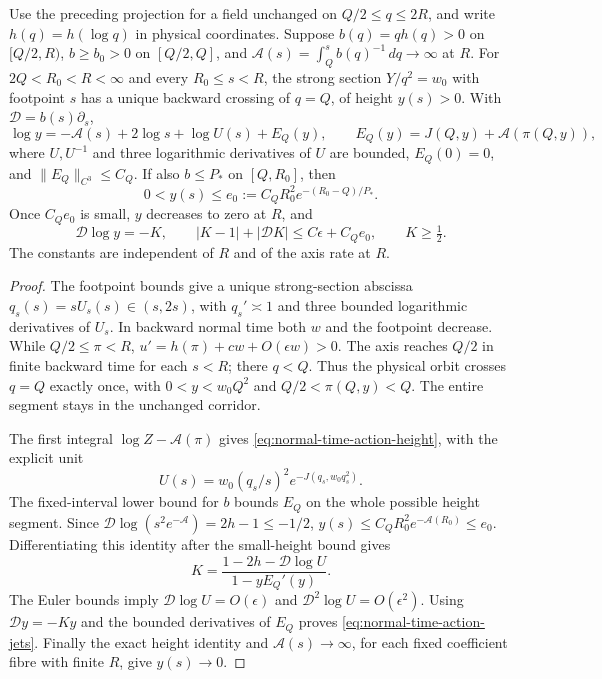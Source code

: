 \begin{lemma}
\label{lem:normal-time-action-height}
Use the preceding projection for a field unchanged on
\(Q/2\le q\le2R\), and write \(h(q)=h(\log q)\) in physical
coordinates. Suppose \(b(q)=qh(q)>0\) on \([Q/2,R)\),
\(b\ge b_0>0\) on \([Q/2,Q]\), and
\(\mathcal A(s)=\int_Q^s b(q)^{-1}\,dq\to\infty\) at \(R\).
For \(2Q<R_0<R<\infty\) and every \(R_0\le s<R\), the strong section
\(Y/q^2=w_0\) with footpoint \(s\) has a unique backward crossing of
\(q=Q\), of height \(y(s)>0\). With \(\mathcal D=b(s)\partial_s\),
\begin{equation}\label{eq:normal-time-action-height}
 \log y=-\mathcal A(s)+2\log s+\log U(s)+E_Q(y),\qquad
 E_Q(y)=J(Q,y)+\mathcal A(\pi(Q,y)),
\end{equation}
where \(U,U^{-1}\) and three logarithmic derivatives of \(U\) are
bounded, \(E_Q(0)=0\), and \(\|E_Q\|_{C^3}\le C_Q\).
If also \(b\le P_*\) on \([Q,R_0]\), then
\[
 0<y(s)\le e_0:=C_QR_0^2e^{-(R_0-Q)/P_*}.
\]
Once \(C_Qe_0\) is small, \(y\) decreases to zero at \(R\), and
\begin{equation}\label{eq:normal-time-action-jets}
 \mathcal D\log y=-K,\qquad
 |K-1|+|\mathcal DK|\le C\epsilon+C_Qe_0,\qquad K\ge\tfrac12.
\end{equation}
The constants are independent of \(R\) and of the axis rate at \(R\).
\end{lemma}
\begin{proof}
The footpoint bounds give a unique strong-section abscissa
\(q_s(s)=sU_s(s)\in(s,2s)\), with \(q_s'\asymp1\) and
three bounded logarithmic derivatives of \(U_s\). In backward
normal time both \(w\) and the footpoint decrease. While
\(Q/2\le\pi<R\),
\(u'=h(\pi)+cw+O(\epsilon w)>0\).
The axis reaches \(Q/2\) in finite backward time for each \(s<R\);
there \(q<Q\). Thus the physical orbit crosses \(q=Q\) exactly
once, with \(0<y<w_0Q^2\) and \(Q/2<\pi(Q,y)<Q\).
The entire segment stays in the unchanged corridor.

The first integral \(\log Z-\mathcal A(\pi)\) gives
\eqref{eq:normal-time-action-height}, with the explicit unit
\[
 U(s)=w_0(q_s/s)^2e^{-J(q_s,w_0q_s^2)}.
\]
The fixed-interval lower bound for
\(b\) bounds \(E_Q\) on the whole possible height segment.
Since \(\mathcal D\log(s^2e^{-\mathcal A})=2h-1\le-1/2\),
\(y(s)\le C_QR_0^2e^{-\mathcal A(R_0)}\le e_0\).
Differentiating this identity after the small-height bound gives
\[
 K=\frac{1-2h-\mathcal D\log U}{1-yE_Q'(y)}.
\]
The Euler bounds imply \(\mathcal D\log U=O(\epsilon)\) and
\(\mathcal D^2\log U=O(\epsilon^2)\). Using
\(\mathcal Dy=-Ky\) and the bounded derivatives of \(E_Q\)
proves \eqref{eq:normal-time-action-jets}. Finally the exact
height identity and \(\mathcal A(s)\to\infty\), for each fixed
coefficient fibre with finite \(R\), give \(y(s)\to0\).
\end{proof}
